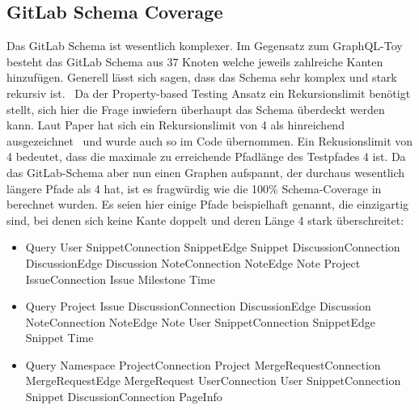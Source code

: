 \subsection{GitLab Schema Coverage}

Das GitLab Schema ist wesentlich komplexer.
Im Gegensatz zum GraphQL-Toy besteht das GitLab Schema aus 37 Knoten welche jeweils zahlreiche Kanten hinzufügen.
Generell lässt sich sagen, dass das Schema sehr komplex und stark rekursiv ist.~\cite[vgl. Studied Cases 2]{property-based-testing}
Da der Property-based Testing Ansatz ein Rekursionslimit benötigt stellt, sich hier die Frage inwiefern überhaupt das Schema überdeckt werden kann.
Laut Paper hat sich ein Rekursionslimit von 4 als hinreichend ausgezeichnet~\cite[vgl. Table 1 ]{property-based-testing} und wurde auch so im Code übernommen.
Ein Rekusionslimit von 4 bedeutet, dass die maximale zu erreichende Pfadlänge des Testpfades 4 ist.
Da das GitLab-Schema aber nun einen Graphen aufspannt, der durchaus wesentlich längere Pfade als 4 hat, ist es fragwürdig wie die 100\% Schema-Coverage in~\cite[Table 1]{property-based-testing} berechnet wurden.
Es seien hier einige Pfade beispielhaft genannt, die einzigartig sind, bei denen sich keine Kante doppelt und deren Länge 4 stark überschreitet: \\

\begin{itemize}
    \item Query \textrightarrow User \textrightarrow SnippetConnection \textrightarrow SnippetEdge \textrightarrow Snippet \textrightarrow DiscussionConnection \textrightarrow DiscussionEdge \textrightarrow Discussion \textrightarrow NoteConnection \textrightarrow NoteEdge \textrightarrow Note \textrightarrow Project \textrightarrow IssueConnection \textrightarrow Issue \textrightarrow Milestone \textrightarrow Time
    \item Query \textrightarrow Project \textrightarrow Issue \textrightarrow DiscussionConnection \textrightarrow DiscussionEdge \textrightarrow Discussion \textrightarrow NoteConnection \textrightarrow NoteEdge \textrightarrow Note \textrightarrow User \textrightarrow SnippetConnection \textrightarrow SnippetEdge \textrightarrow Snippet \textrightarrow Time \\
    \item Query \textrightarrow Namespace \textrightarrow ProjectConnection \textrightarrow Project \textrightarrow MergeRequestConnection \textrightarrow MergeRequestEdge \textrightarrow MergeRequest \textrightarrow UserConnection \textrightarrow User \textrightarrow SnippetConnection \textrightarrow Snippet \textrightarrow DiscussionConnection \textrightarrow PageInfo \\
\end{itemize}

